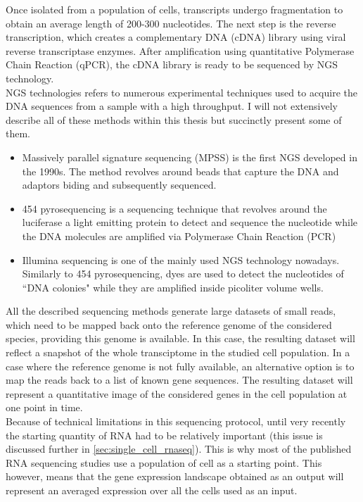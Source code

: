     Once isolated from a population of cells, transcripts undergo fragmentation to obtain an average length of 200-300 nucleotides. The next step is the reverse transcription, which creates a complementary DNA (cDNA) library using viral reverse transcriptase enzymes. After amplification using quantitative Polymerase Chain Reaction (qPCR), the cDNA library is ready to be sequenced by NGS technology.\\
    
    NGS technologies refers to numerous experimental techniques used to acquire the DNA sequences from a sample with a high throughput. I will not extensively describe all of these methods within this thesis but succinctly present some of them. 
    
\begin{itemize}
	\item Massively parallel signature sequencing (MPSS) \cite{brenner00} is the first NGS developed in the 1990s. The method revolves around beads that capture the DNA and adaptors biding and subsequently sequenced.
	
	\item 454 pyrosequencing \cite{margulies05} is a sequencing technique that revolves around the luciferase a light emitting protein to detect and sequence the nucleotide while the DNA molecules are amplified via Polymerase Chain Reaction (PCR)
	
	\item Illumina sequencing \cite{bentley08} is one of the mainly used NGS technology nowadays. Similarly to 454 pyrosequencing, dyes are used to detect the nucleotides of ``DNA colonies" while they are amplified inside picoliter volume wells.
    
\end{itemize}     
    
    All the described sequencing methods generate large datasets of small reads, which need to be mapped back onto the reference genome of the considered species, providing this genome is available. In this case, the resulting dataset will reflect a snapshot of the whole transciptome in the studied cell population. In a case where the reference genome is not fully available, an alternative option is to map the reads back to a list of known gene sequences. The resulting dataset will represent a quantitative image of the considered genes in the cell population at one point in time.\\
    
    Because of technical limitations in this sequencing protocol, until very recently the starting quantity of RNA had to be relatively important (this issue is discussed further in \ref{sec:single_cell_rnaseq}). This is why most of the published RNA sequencing studies use a population of cell as a starting point. This however, means that the gene expression landscape obtained as an output will represent an averaged expression over all the cells used as an input.\\
    
